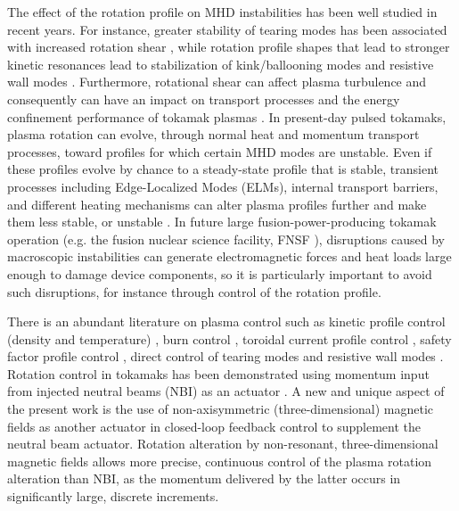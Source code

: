 \documentclass[12pt,lot, lof]{puthesis}
\begin{document}
The effect of the rotation profile on MHD instabilities has been well studied in
recent years.  For instance, greater stability of tearing modes has been associated with
increased rotation shear \cite{Gerhardt09, Park13}, while
rotation profile shapes that lead to stronger kinetic resonances lead to
stabilization of kink/ballooning modes and resistive wall modes \cite{Sabbagh10,
  Berkery10}. Furthermore, rotational shear can affect plasma turbulence and
consequently can have an impact on transport processes and the energy
confinement performance of tokamak plasmas \cite{Biglari90, Terry00, Hahm94}. In present-day pulsed tokamaks,
plasma rotation can evolve, through normal heat and momentum transport
processes, toward profiles for which certain MHD modes are unstable.
%
Even if these profiles evolve by chance to a steady-state profile that is
stable, transient processes including Edge-Localized Modes (ELMs), internal transport
barriers, and different heating mechanisms can alter plasma profiles further and make
them less stable, or unstable \cite{Sabbagh13}.
%
In future large fusion-power-producing tokamak operation (e.g. the fusion nuclear science facility, FNSF
\cite{Peng05, Peng11, Peng09}), disruptions caused by macroscopic instabilities can generate
electromagnetic forces and heat loads large enough to damage device components,
so it is particularly important to avoid such disruptions, for instance through
control of the rotation profile.

There is an abundant literature on plasma control such as kinetic profile control (density and temperature) \cite{Schuster02, Boyer11}, burn control \cite{Schuster01, Schuster02-2, Schuster02-3, Vitela98, Boyer12}, toroidal current profile control \cite{Boyer133, Boyer144, Barton12, Ou09, Ebrahimi04},  safety factor profile control \cite{Argomedo13, Maljaars15, Kim12},  direct control of tearing modes \cite{Welander13, Volpe09} and resistive wall modes \cite{Sabbagh06,Sabbagh13}. Rotation control in tokamaks has been demonstrated using momentum input from injected neutral beams (NBI) as an actuator \cite{Scoville07, Yoshida09}.  A new and unique aspect of the present work is the use of non-axisymmetric (three-dimensional) magnetic fields as another actuator in closed-loop feedback control to supplement the neutral beam actuator. Rotation alteration by non-resonant, three-dimensional magnetic fields allows more precise, continuous control of the plasma rotation alteration than NBI, as the momentum delivered by the latter occurs in significantly large, discrete increments.
\end{document}
